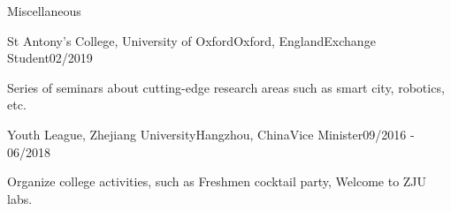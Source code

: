 \documentclass{resume}
\begin{document}
\begin{rSection}{Miscellaneous}

\begin{rSubsection}{St Antony's College, University of Oxford}{Oxford, England}{Exchange Student}{02/2019}
\item Series of seminars about cutting-edge research areas such as smart city, robotics, etc.
\end{rSubsection}

\begin{rSubsection}{Youth League, Zhejiang University}{Hangzhou, China}{Vice Minister}{09/2016 - 06/2018}
\item Organize college activities, such as Freshmen cocktail party, Welcome to ZJU labs.
\end{rSubsection}


\end{rSection}

\end{document}
